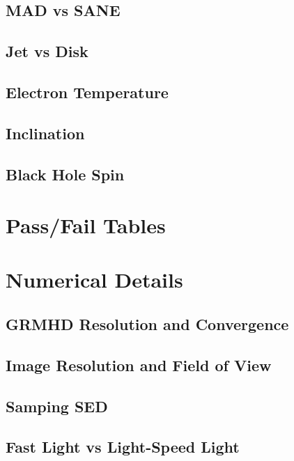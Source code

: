 \documentclass[twocolumn,twocolappendix,tighten,dvipsnames,linenumbers]{aastex63}
\begin{document}
\subsection{MAD vs SANE}

\subsection{Jet vs Disk}

\subsection{Electron Temperature}

\subsection{Inclination}

\subsection{Black Hole Spin}

\clearpage

 \software{\ehtim, \difmap, \smili, \dmc, \themis, \foci}

\appendix

\section{Pass/Fail Tables}

\clearpage

\section{Numerical Details}

\subsection{GRMHD Resolution and Convergence}

\subsection{Image Resolution and Field of View}

\subsection{Samping SED}

\subsection{Fast Light vs Light-Speed Light}

\clearpage




\end{document}
